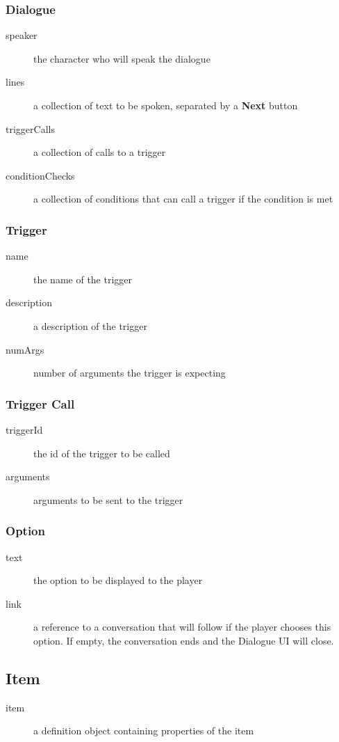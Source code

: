\subsubsection{Dialogue}
\begin{description}
\item[speaker]{the character who will speak the dialogue}
\item[lines]{a collection of text to be spoken, separated by a \textbf{Next} button}
\item[triggerCalls]{a collection of calls to a trigger}
\item[conditionChecks]{a collection of conditions that can call a trigger if the condition is met}
\end{description}

\subsubsection{Trigger}
\begin{description}
\item[name]{the name of the trigger}
\item[description]{a description of the trigger}
\item[numArgs]{number of arguments the trigger is expecting}
\end{description}

\subsubsection{Trigger Call}
\begin{description}
\item[triggerId]{the id of the trigger to be called}
\item[arguments]{arguments to be sent to the trigger}
\end{description}

\subsubsection{Option}
\begin{description}
\item[text]{the option to be displayed to the player}
\item[link]{a reference to a conversation that will follow if the player chooses this option. If empty, the conversation ends and the Dialogue UI will close.}
\end{description}

\subsection{Item}
\begin{description}
\item[item]{a definition object containing properties of the item}
\end{description}


